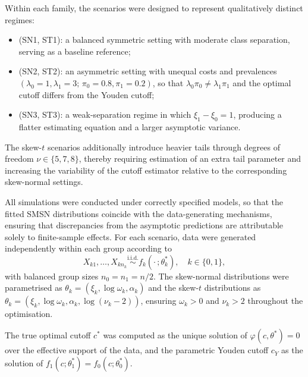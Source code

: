 \documentclass[11pt,a4paper]{article}
\theoremstyle{definition}
\theoremstyle{remark}
\newcommand{\1}{\mathbf{1}}
\begin{document}
\noindent
Within each family, the scenarios were designed to represent qualitatively distinct regimes:
\begin{itemize}
  \item \textup{(SN1, ST1):} a balanced symmetric setting with moderate class separation, serving as a baseline reference;
  \item \textup{(SN2, ST2):} an asymmetric setting with
        unequal costs and prevalences
        $(\lambda_0=1,\lambda_1=3;\,\pi_0=0.8,\pi_1=0.2)$,
        so that $\lambda_0\pi_0\neq\lambda_1\pi_1$ and the
        optimal cutoff differs from the Youden cutoff;
  \item \textup{(SN3, ST3):} a weak-separation regime in which $\xi_1-\xi_0=1$, producing a flatter estimating equation and a larger asymptotic variance.
\end{itemize}
The skew-$t$ scenarios additionally introduce heavier tails through degrees of freedom $\nu\in\{5,7,8\}$, thereby requiring estimation of an extra tail parameter and increasing the variability of the cutoff estimator relative to the corresponding skew-normal settings.

All simulations were conducted under correctly specified models, so that the fitted SMSN distributions coincide with the data-generating mechanisms, ensuring that discrepancies
from the asymptotic predictions are attributable solely to finite-sample effects. For each scenario, data were generated independently within
each group according to
\[
X_{k1},\ldots,X_{kn_k}
\stackrel{\mathrm{i.i.d.}}{\sim}
f_k(\cdot\,;\theta_k^*),
\quad k\in\{0,1\},
\]
with balanced group sizes $n_0=n_1=n/2$.
The skew-normal distributions were parametrised as
$\theta_k=(\xi_k,\log\omega_k,\alpha_k)$ and the skew-$t$
distributions as
$\theta_k=(\xi_k,\log\omega_k,\alpha_k,\log(\nu_k-2))$,
ensuring $\omega_k>0$ and $\nu_k>2$ throughout the
optimisation.

The true optimal cutoff $c^*$ was computed as the unique
solution of $\varphi(c,\theta^*)=0$ over the effective
support of the data, and the parametric Youden cutoff
$c_Y$ as the solution of $f_1(c;\theta_1^*)=f_0(c;\theta_0^*)$.
\end{document}
